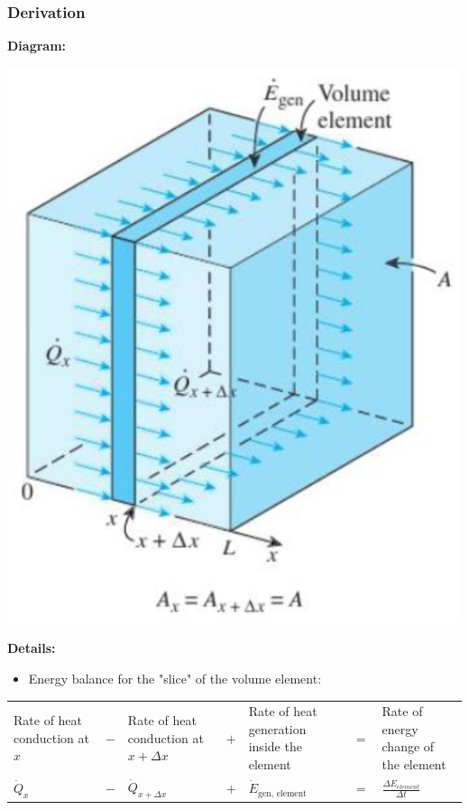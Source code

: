 \documentclass[11pt]{article}
\begin{document}
\subsubsection{Derivation}
\label{sec:orgcc8ad20}
\textbf{Diagram:}
\begin{center}
\includegraphics[scale=0.5]{./images/one-dimensional-heat-conduction.png}
\end{center}

\textbf{Details:}
\begin{itemize}
\item Energy balance for the "slice" of the volume element:
\end{itemize}
\begin{center}
\begin{tabular}{>{\centering\arraybackslash}m{7em} >{\centering\arraybackslash}m{1em} >{\centering\arraybackslash}m{7em} >{\centering\arraybackslash}m{1em} >{\centering\arraybackslash}m{7em} >{\centering\arraybackslash}m{1em} >{\centering\arraybackslash}m{7em}}
Rate of heat conduction at \(x\) & \(-\) & Rate of heat conduction at \(x + \Delta x\) & \(+\) & Rate of heat generation inside the element & \(=\) & Rate of energy change of the element\\[0pt]
\(\dot{Q}_x\) & \(-\) & \(\dot{Q}_{x + \Delta x}\) & \(+\) & \(\dot{E}_{\text{gen, element}}\) & \(=\) & \(\frac{\Delta E_{element}}{\Delta t}\)\\[0pt]
\end{tabular}
\end{center}
\end{document}

